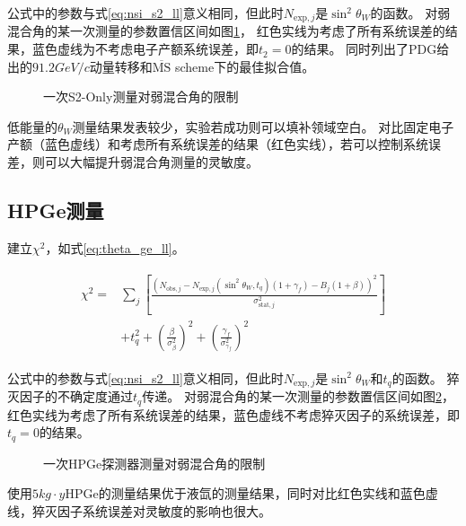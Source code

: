 公式中的参数与式\ref{eq:nsi_s2_ll}意义相同，但此时$N_{\mathrm{exp},j}$是$\sin^2\theta_W$的函数。
对弱混合角的某一次测量的参数置信区间如图\ref{fig:thetaw_sensitivity_s2only}，
红色实线为考虑了所有系统误差的结果，蓝色虚线为不考虑电子产额系统误差，即$t_2=0$的结果。
同时列出了PDG给出的$91.2\si{GeV/c}$动量转移和$\overline{\mathrm{MS}}$ scheme下的最佳拟合值\cite{particle_data_group_review_2020}。

\begin{figure}
  \centering
  
  \caption{\label{fig:thetaw_sensitivity_s2only} 一次S2-Only测量对弱混合角的限制}
\end{figure}

低能量的$\theta_W$测量结果发表较少，实验若成功则可以填补领域空白。
对比固定电子产额（蓝色虚线）和考虑所有系统误差的结果（红色实线），若可以控制系统误差，则可以大幅提升弱混合角测量的灵敏度。

\subsection{HPGe测量}

建立$\chi^2$，如式\ref{eq:theta_ge_ll}。

\begin{align}
    \label{eq:theta_ge_ll}
    \begin{split}
    \chi^2 =& \sum_j\left[\frac{\left(N_{\mathrm{obs},j} - N_{\mathrm{exp},j}(\sin^2\theta_W, t_q)(1 + \gamma_f) 
    - B_{j}(1 + \beta)\right)^2}{\sigma^2_{\mathrm{stat},j}}\right] \\
    & + t_q^2 + (\frac{\beta}{\sigma^2_{\beta}})^2 + (\frac{\gamma_f}{\sigma^2_{\gamma_f}})^2
    \end{split}
\end{align}

公式中的参数与式\ref{eq:nsi_s2_ll}意义相同，但此时$N_{\mathrm{exp},j}$是$\sin^2\theta_W$和$t_q$的函数。
猝灭因子的不确定度通过$t_q$传递。
对弱混合角的某一次测量的参数置信区间如图\ref{fig:thetaw_sensitivity_ge}，
红色实线为考虑了所有系统误差的结果，蓝色虚线不考虑猝灭因子的系统误差，即$t_q=0$的结果。

\begin{figure}
    \centering
    
    \caption{\label{fig:thetaw_sensitivity_ge} 一次HPGe探测器测量对弱混合角的限制}
\end{figure}

使用$5\si{kg\cdot y}$HPGe的测量结果优于液氙的测量结果，同时对比红色实线和蓝色虚线，猝灭因子系统误差对灵敏度的影响也很大。

